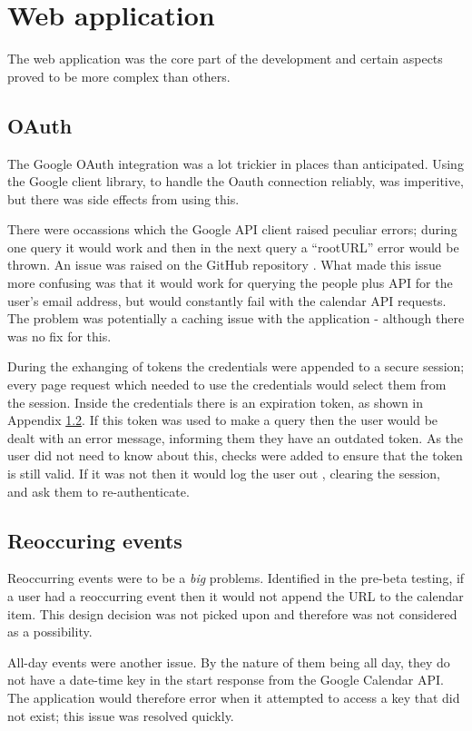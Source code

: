 {{{{{{\section{Web application}
The web application was the core part of the development and certain aspects proved to be more complex than others.
\subsection{OAuth}\label{app:oauth}
The Google OAuth integration was a lot trickier in places than anticipated. Using the Google client library, to handle the Oauth connection reliably, was imperitive, but there was side effects from using this.

There were occassions which the Google API client raised peculiar errors; during one query it would work and then in the next query a ``rootURL'' error would be thrown. An issue was raised on the GitHub repository \cite{citeulike:14021433}. What made this issue more confusing was that it would work for querying the people plus API for the user's email address, but would constantly fail with the calendar API requests. The problem was potentially a caching issue with the application - although there was no fix for this.

During the exhanging of tokens the credentials were appended to a secure session; every page request which needed to use the credentials would select them from the session. Inside the credentials there is an expiration token, as shown in Appendix \ref{}. If this token was used to make a query then the user would be dealt with an error message, informing them they have an outdated token. As the user did not need to know about this, checks were added to ensure that the token is still valid. If it was not then it would log the user out , clearing the session, and ask them to re-authenticate.

\subsection{Reoccuring events}
Reoccurring events were to be a \textit{big} problems. Identified in the pre-beta testing, if a user had a reoccurring event then it would not append the URL to the calendar item. This design decision was not picked upon and therefore was not considered as a possibility.

All-day events were another issue. By the nature of them being all day, they do not have a date-time key in the start response from the Google Calendar API. The application would therefore error when it attempted to access a key that did not exist; this issue was resolved quickly.

}}}}}}
